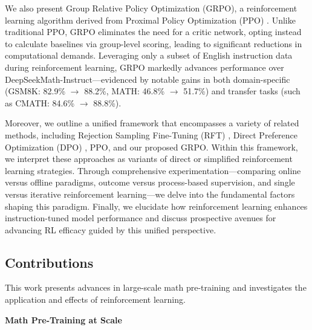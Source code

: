 We also present Group Relative Policy Optimization (GRPO), a reinforcement learning algorithm derived from Proximal Policy Optimization (PPO) \citep{schulman2017proximal}. Unlike traditional PPO, GRPO eliminates the need for a critic network, opting instead to calculate baselines via group-level scoring, leading to significant reductions in computational demands. Leveraging only a subset of English instruction data during reinforcement learning, GRPO markedly advances performance over DeepSeekMath-Instruct—evidenced by notable gains in both domain-specific (GSM8K: 82.9\% $\rightarrow$ 88.2\%, MATH: 46.8\% $\rightarrow$ 51.7\%) and transfer tasks (such as CMATH: 84.6\% $\rightarrow$ 88.8\%). 

Moreover, we outline a unified framework that encompasses a variety of related methods, including Rejection Sampling Fine-Tuning (RFT) \citep{yuan2023scaling}, Direct Preference Optimization (DPO) \citep{dpo}, PPO, and our proposed GRPO. Within this framework, we interpret these approaches as variants of direct or simplified reinforcement learning strategies. Through comprehensive experimentation—comparing online versus offline paradigms, outcome versus process-based supervision, and single versus iterative reinforcement learning—we delve into the fundamental factors shaping this paradigm. Finally, we elucidate how reinforcement learning enhances instruction-tuned model performance and discuss prospective avenues for advancing RL efficacy guided by this unified perspective.

\subsection{Contributions}
This work presents advances in large-scale math pre-training and investigates the application and effects of reinforcement learning.

\textbf{Math Pre-Training at Scale}


